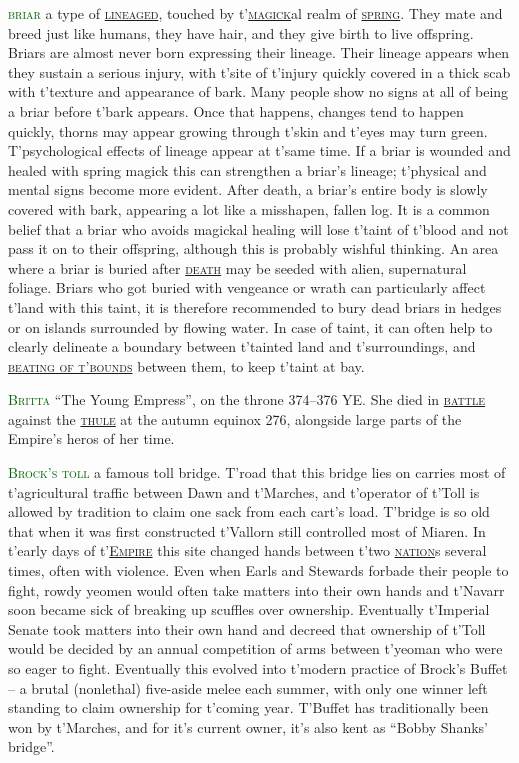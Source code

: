 \documentclass[twoside,11pt,b5paper,twocolumn]{scrbook}
\newcommand{\estcab}[1]{\textsc{\textcolor{marron}{#1}}}
\newcommand{\keyword}[1]{\textcolor{darkgreen}{#1}}
\renewcommand{\paragraph}[1]{\par\noindent\markboth{#1}{#1}\estcab{\keyword{#1}}\label{#1} }
\newcommand{\see}[1]{{\estcab{\hyperref[#1]{#1}}}}
\begin{document}
\paragraph{briar} a type of \see{lineaged}, touched by t'\see{magick}al realm of \see{spring}. They mate and breed just like humans, they have hair, and they give birth to live offspring. Briars are almost never born expressing their lineage. Their lineage appears when they sustain a serious injury, with t'site of t'injury quickly covered in a thick scab with t'texture and appearance of bark. Many people show no signs at all of being a briar before t'bark appears. Once that happens, changes tend to happen quickly, thorns may appear growing through t'skin and t'eyes may turn green. T'psychological effects of lineage appear at t'same time. If a briar is wounded and healed with spring magick this can strengthen a briar's lineage; t'physical and mental signs become more evident. After death, a briar’s entire body is slowly covered with bark, appearing a lot like a misshapen, fallen log. It is a common belief that a briar who avoids magickal healing will lose t'taint of t'blood and not pass it on to their offspring, although this is probably wishful thinking. An area where a briar is buried after \see{death} may be seeded with alien, supernatural foliage. Briars who got buried with vengeance or wrath can particularly affect t'land with this taint, it is therefore recommended to bury dead briars in hedges or on islands surrounded by flowing water. In case of taint, it can often help to clearly delineate a boundary between t'tainted land and t'surroundings, and \see{beating of t'bounds} between them, to keep t'taint at bay.
\paragraph{Britta} “The Young Empress”, on the throne 374–376 YE. She died in \see{battle} against the \see{thule} at the autumn equinox 276, alongside large parts of the Empire's heros of her time.
\paragraph{Brock's toll} a famous toll bridge. T'road that this bridge lies on carries most of t'agricultural traffic between Dawn and t'Marches, and t'operator of t'Toll is allowed by tradition to claim one sack from each cart's load. T'bridge is so old that when it was first constructed t'Vallorn still controlled most of Miaren. In t'early days of t'\see{Empire} this site changed hands between t'two \see{nation}s several times, often with violence. Even when Earls and Stewards forbade their people to fight, rowdy yeomen would often take matters into their own hands and t'Navarr soon became sick of breaking up scuffles over ownership. Eventually t'Imperial Senate took matters into their own hand and decreed that ownership of t'Toll would be decided by an annual competition of arms between t'yeoman who were so eager to fight. Eventually this evolved into t'modern practice of Brock's Buffet – a brutal (nonlethal) five-aside melee each summer, with only one winner left standing to claim ownership for t'coming year. T'Buffet has traditionally been won by t'Marches, and for it's current owner, it's also kent as “Bobby Shanks' bridge”.
\end{document}

